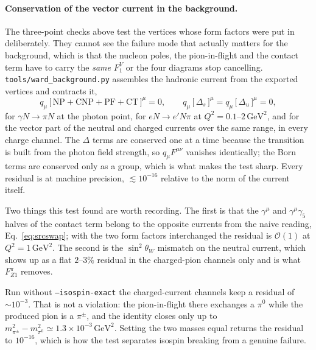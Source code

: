 \documentclass[11pt,a4paper]{article}
\newcommand{\code}[1]{\texttt{\small #1}}
\begin{document}
\paragraph{Conservation of the vector current in the background.}
The three-point checks above test the vertices whose form factors were put in
deliberately. They cannot see the failure mode that actually matters for the
background, which is that the nucleon poles, the pion-in-flight and the contact
term have to carry the \emph{same} $F_1^V$ or the four diagrams stop
cancelling. \code{tools/ward\_background.py} assembles the hadronic current from
the exported vertices and contracts it,
\begin{equation}
  q_\mu\,\big[\,\mathrm{NP} + \mathrm{CNP} + \mathrm{PF} + \mathrm{CT}\,\big]^\mu = 0 ,
  \qquad
  q_\mu\,\big[\,\Delta_s\,\big]^\mu = q_\mu\,\big[\,\Delta_u\,\big]^\mu = 0 ,
\end{equation}
for $\gamma N\to\pi N$ at the photon point, for $e N\to e'N\pi$ at
$Q^2 = 0.1$--$2\,\mathrm{GeV}^2$, and for the vector part of the neutral and
charged currents over the same range, in every charge channel. The $\Delta$
terms are conserved one at a time because the transition is built from the
photon field strength, so $q_\mu F^{\mu\nu}$ vanishes identically; the Born
terms are conserved only as a group, which is what makes the test sharp. Every
residual is at machine precision, $\lesssim 10^{-16}$ relative to the norm of
the current itself.

Two things this test found are worth recording. The first is that the
$\gamma^\mu$ and $\gamma^\mu\gamma_5$ halves of the contact term belong to the
opposite currents from the naive reading, Eq.~\eqref{eq:srcswap}; with the two
form factors interchanged the residual is $\mathcal{O}(1)$ at $Q^2 =
1\,\mathrm{GeV}^2$. The second is the $\sin^2\theta_W$ mismatch on the neutral
current, which shows up as a flat $2$--$3\%$ residual in the charged-pion
channels only and is what $F_{Z1}^{\pi}$ removes.

Run without \code{--isospin-exact} the charged-current channels keep a residual
of $\sim\!10^{-3}$. That is not a violation: the pion-in-flight there exchanges
a $\pi^0$ while the produced pion is a $\pi^\pm$, and the identity closes only
up to $m_{\pi^\pm}^2 - m_{\pi^0}^2 \simeq 1.3\times10^{-3}\,\mathrm{GeV}^2$.
Setting the two masses equal returns the residual to $10^{-16}$, which is how
the test separates isospin breaking from a genuine failure.
\end{document}
